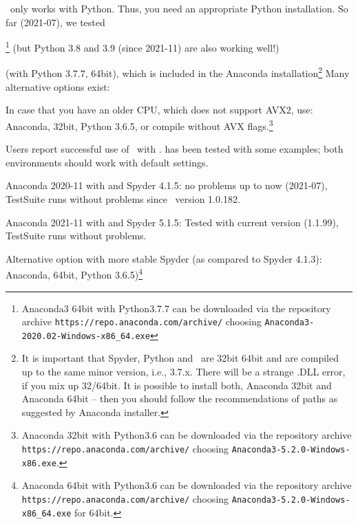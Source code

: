 \codeName\ only works with Python. Thus, you need an appropriate Python installation.
So far (2021-07), we tested
\bi
  \item {}\footnote{Anaconda3 64bit with Python3.7.7 can be downloaded via the repository archive \texttt{https://repo.anaconda.com/archive/} choosing \texttt{Anaconda3-2020.02-Windows-x86\_64.exe}} (but Python 3.8 and 3.9 (since 2021-11) are also working well!)
  \item {} (with Python 3.7.7, 64bit), which is included in the Anaconda installation\footnote{It is important that Spyder, Python and \codeName\  are  32bit  64bit and are compiled up to the same minor version, i.e., 3.7.x. There will be a strange .DLL error, if you mix up 32/64bit. It is possible to install both, Anaconda 32bit and Anaconda 64bit -- then you should follow the recommendations of paths as suggested by Anaconda installer.}
\ei
Many alternative options exist:
\bi
  \item In case that you have an older CPU, which does not support AVX2, use: Anaconda, 32bit, Python 3.6.5, or compile without AVX flags.\footnote{Anaconda 32bit with Python3.6 can be downloaded via the repository archive \texttt{https://repo.anaconda.com/archive/} choosing \texttt{Anaconda3-5.2.0-Windows-x86.exe}.}
  \item Users report successful use of \codeName\ with .  has been tested with some examples; both environments should work with default settings.
  \item Anaconda 2020-11 with  and Spyder 4.1.5: no problems up to now (2021-07), TestSuite runs without problems since \codeName\ version 1.0.182.
  \item Anaconda 2021-11 with  and Spyder 5.1.5: Tested with current version (1.1.99), TestSuite runs without problems.
  \item Alternative option with more stable Spyder (as compared to Spyder 4.1.3): Anaconda, 64bit, Python 3.6.5)\footnote{Anaconda 64bit with Python3.6 can be downloaded via the repository archive \texttt{https://repo.anaconda.com/archive/} choosing \texttt{Anaconda3-5.2.0-Windows-x86\_64.exe} for 64bit.}
